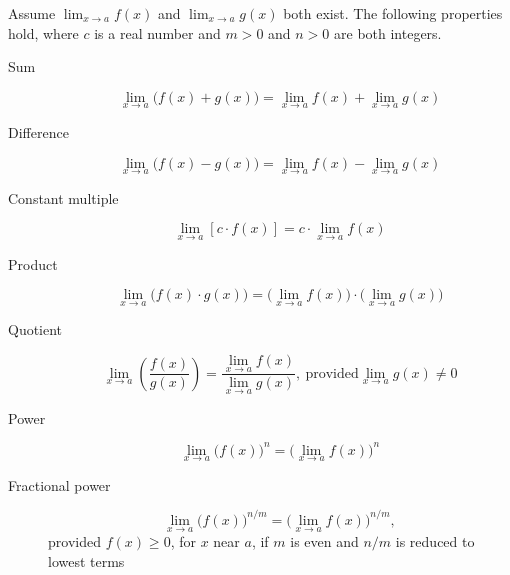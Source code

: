 \documentclass[nooutcomes]{ximera}
\begin{document}
  Assume $\lim_{x \to a} f(x)$ and $\lim_{x \to a} g(x)$ both exist.
  The following properties hold, where $c$ is a real number and $m > 0$ and $n > 0$ are both integers.
  \begin{description}
      \item[Sum]
        \[
          \lim_{x \to a} \bigl(f(x) + g(x)\bigr) = \lim_{x \to a} f(x) + \lim_{x \to a} g(x)
        \]

      \item[Difference]
        \[
          \lim_{x \to a} \bigl(f(x) - g(x)\bigr) = \lim_{x \to a} f(x) - \lim_{x \to a} g(x)
        \]

      \item[Constant multiple]
        \[
          \lim_{x \to a} \left[c \cdot f(x) \right] = c \cdot \lim_{x \to a} f(x)
        \]

      \item[Product]
        \[
          \lim_{x \to a} \bigl(f(x) \cdot g(x)\bigr) = \bigl(\lim_{x \to a} f(x)\bigr) \cdot \bigl(\lim_{x \to a} g(x) \bigr)
        \]

      \item[Quotient]
        \[
          \lim_{x \to a} \left(\frac{f(x)}{g(x)}\right) = \frac{\lim_{x \to a} f(x)}{\lim_{x \to a} g(x)},\ \text{provided} \lim_{x \to a} g(x) \ne 0
        \]   

      \item[ Power]
        \[
          \lim_{x \to a} \bigl(f(x)\bigr)^n = \bigl(\lim_{x \to a} f(x)\bigr)^n
        \]

      \item[Fractional power]
        \[
          \lim_{x \to a} \bigl(f(x)\bigr)^{n/m} = \bigl(\lim_{x \to a} f(x)\bigr)^{n/m},
        \]
        provided $f(x) \ge 0$, for $x$ near $a$, if $m$ is even and $n/m$ is reduced to lowest terms
    \end{description}
\end{document}
